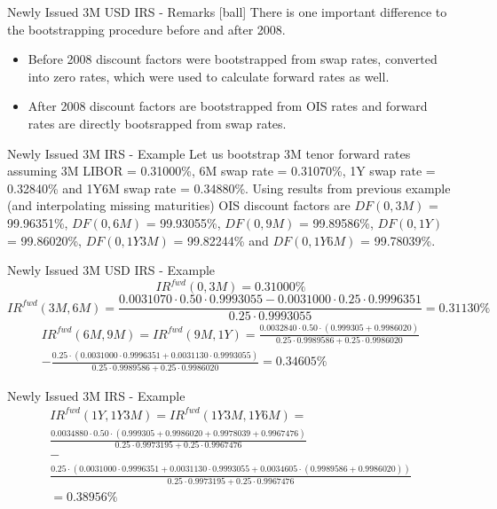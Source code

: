 \documentclass{beamer}
\newcommand\applyFontA{\fontsize{6}{6}\selectfont}
\begin{document}
\begin{frame}{Newly Issued 3M USD IRS - Remarks}
[ball]
There is one important difference to the bootstrapping procedure before and after 2008.
\begin{itemize}
\item Before 2008 discount factors were bootstrapped from swap rates, converted into zero rates, which were used to calculate forward rates as well.
\item After 2008 discount factors are bootstrapped from OIS rates and forward rates are directly bootsrapped from swap rates.
\end{itemize}
\end{frame}

\begin{frame}{Newly Issued 3M IRS - Example}
Let us bootstrap 3M tenor forward rates assuming 3M LIBOR = 0.31000\%, 6M swap rate = 0.31070\%, 1Y swap rate = 0.32840\% and 1Y6M swap rate = 0.34880\%. Using results from previous example (and interpolating missing maturities) OIS discount factors are $DF(0, 3M)$ = 99.96351\%, $DF(0, 6M)$ = 99.93055\%, $DF(0, 9M)$ = 99.89586\%, $DF(0, 1Y)$ = 99.86020\%, $DF(0, 1Y3M)$ = 99.82244\% and $DF(0, 1Y6M)$ = 99.78039\%.
\end{frame}

\begin{frame}{Newly Issued 3M USD IRS - Example}
\applyFontA
\begin{equation*}
IR^{fwd}(0, 3M) = 0.31000\%
\end{equation*}
\begin{equation*}
IR^{fwd}(3M, 6M) = \frac{0.0031070 \cdot 0.50 \cdot 0.9993055 - 0.0031000 \cdot 0.25 \cdot 0.9996351}{0.25 \cdot 0.9993055} = 0.31130\%
\end{equation*}
\begin{multline*}
IR^{fwd}(6M, 9M) = IR^{fwd}(9M, 1Y) = \frac{0.0032840 \cdot 0.50 \cdot (0.999305 + 0.9986020)}{0.25 \cdot 0.9989586 + 0.25 \cdot 0.9986020}\\
- \frac{0.25 \cdot (0.0031000 \cdot 0.9996351 + 0.0031130 \cdot 0.9993055)}{0.25 \cdot 0.9989586 + 0.25 \cdot 0.9986020} = 0.34605\%
\end{multline*}
\end{frame}

\begin{frame}{Newly Issued 3M IRS - Example}
\applyFontA
\begin{multline*}
IR^{fwd}(1Y, 1Y3M) = IR^{fwd}(1Y3M, 1Y6M) =\\
\frac{0.0034880 \cdot 0.50 \cdot (0.999305 + 0.9986020 + 0.9978039 + 0.9967476)}{0.25 \cdot 0.9973195 + 0.25 \cdot 0.9967476}\\
- \\ \frac{0.25 \cdot (0.0031000 \cdot 0.9996351 + 0.0031130 \cdot 0.9993055 + 0.0034605 \cdot (0.9989586 + 0.9986020))}{0.25 \cdot 0.9973195 + 0.25 \cdot 0.9967476}
\\= 0.38956\%
\end{multline*}
\end{frame}
\end{document}
